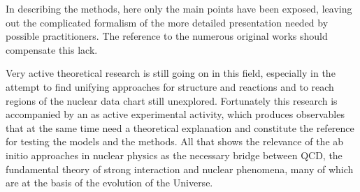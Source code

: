 In describing the methods, here only the main points have been exposed, leaving out the complicated formalism of the more 
detailed presentation needed by possible practitioners. The reference to the numerous original works should 
compensate this lack.

Very active theoretical research is still going on in this field, especially in the attempt to find unifying approaches for structure and reactions 
and to reach regions of the nuclear data chart still unexplored. Fortunately this research is accompanied by an as active experimental 
activity, which produces observables that at the same time need a theoretical explanation and constitute the reference
for testing the models and the methods. All that shows the relevance of the ab initio approaches in nuclear physics as the necessary  bridge   between QCD, the fundamental theory 
of strong interaction and nuclear phenomena, many of which are at the basis of the evolution of the Universe. 

